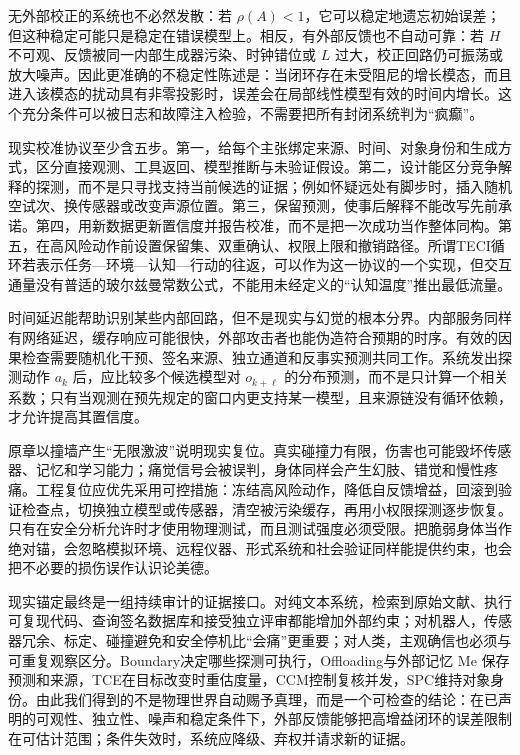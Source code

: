 无外部校正的系统也不必然发散：若 $\rho(A)<1$，它可以稳定地遗忘初始误差；但这种稳定可能只是稳定在错误模型上。相反，有外部反馈也不自动可靠：若 $H$ 不可观、反馈被同一内部生成器污染、时钟错位或 $L$ 过大，校正回路仍可振荡或放大噪声。因此更准确的不稳定性陈述是：当闭环存在未受阻尼的增长模态，而且进入该模态的扰动具有非零投影时，误差会在局部线性模型有效的时间内增长。这个充分条件可以被日志和故障注入检验，不需要把所有封闭系统判为“疯癫”。

现实校准协议至少含五步。第一，给每个主张绑定来源、时间、对象身份和生成方式，区分直接观测、工具返回、模型推断与未验证假设。第二，设计能区分竞争解释的探测，而不是只寻找支持当前候选的证据；例如怀疑远处有脚步时，插入随机空试次、换传感器或改变声源位置。第三，保留预测，使事后解释不能改写先前承诺。第四，用新数据更新置信度并报告校准，而不是把一次成功当作整体同构。第五，在高风险动作前设置保留集、双重确认、权限上限和撤销路径。所谓TECI循环若表示任务—环境—认知—行动的往返，可以作为这一协议的一个实现，但交互通量没有普适的玻尔兹曼常数公式，不能用未经定义的“认知温度”推出最低流量。

时间延迟能帮助识别某些内部回路，但不是现实与幻觉的根本分界。内部服务同样有网络延迟，缓存响应可能很快，外部攻击者也能伪造符合预期的时序。有效的因果检查需要随机化干预、签名来源、独立通道和反事实预测共同工作。系统发出探测动作 $a_k$ 后，应比较多个候选模型对 $o_{k+\ell}$ 的分布预测，而不是只计算一个相关系数；只有当观测在预先规定的窗口内更支持某一模型，且来源链没有循环依赖，才允许提高其置信度。

原章以撞墙产生“无限激波”说明现实复位。真实碰撞力有限，伤害也可能毁坏传感器、记忆和学习能力；痛觉信号会被误判，身体同样会产生幻肢、错觉和慢性疼痛。工程复位应优先采用可控措施：冻结高风险动作，降低自反馈增益，回滚到验证检查点，切换独立模型或传感器，清空被污染缓存，再用小权限探测逐步恢复。只有在安全分析允许时才使用物理测试，而且测试强度必须受限。把脆弱身体当作绝对锚，会忽略模拟环境、远程仪器、形式系统和社会验证同样能提供约束，也会把不必要的损伤误作认识论美德。

现实锚定最终是一组持续审计的证据接口。对纯文本系统，检索到原始文献、执行可复现代码、查询签名数据库和接受独立评审都能增加外部约束；对机器人，传感器冗余、标定、碰撞避免和安全停机比“会痛”更重要；对人类，主观确信也必须与可重复观察区分。Boundary决定哪些探测可执行，Offloading与外部记忆 $\mathrm{Me}$ 保存预测和来源，TCE在目标改变时重估度量，CCM控制复核并发，SPC维持对象身份。由此我们得到的不是物理世界自动赐予真理，而是一个可检查的结论：在已声明的可观性、独立性、噪声和稳定条件下，外部反馈能够把高增益闭环的误差限制在可估计范围；条件失效时，系统应降级、弃权并请求新的证据。
